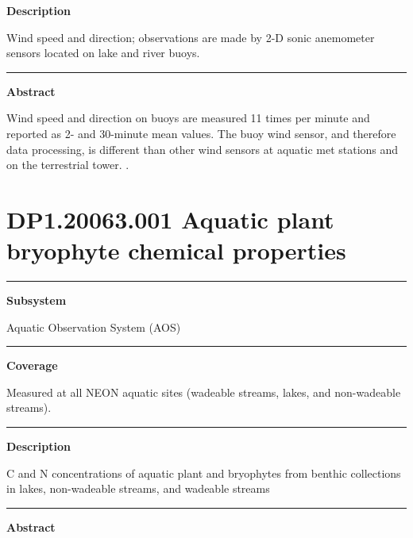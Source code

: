\documentclass[]{article}
\begin{document}
\textbf{Description}

Wind speed and direction; observations are made by 2-D sonic anemometer
sensors located on lake and river buoys.

\begin{center}\rule{0.5\linewidth}{\linethickness}\end{center}

\textbf{Abstract}

Wind speed and direction on buoys are measured 11 times per minute and
reported as 2- and 30-minute mean values. The buoy wind sensor, and
therefore data processing, is different than other wind sensors at
aquatic met stations and on the terrestrial tower. \newpage
.

\section{DP1.20063.001 Aquatic plant bryophyte chemical
properties}\label{dp1.20063.001-aquatic-plant-bryophyte-chemical-properties}

\begin{center}\rule{0.5\linewidth}{\linethickness}\end{center}

\textbf{Subsystem}

Aquatic Observation System (AOS)

\begin{center}\rule{0.5\linewidth}{\linethickness}\end{center}

\textbf{Coverage}

Measured at all NEON aquatic sites (wadeable streams, lakes, and
non-wadeable streams).

\begin{center}\rule{0.5\linewidth}{\linethickness}\end{center}

\textbf{Description}

C and N concentrations of aquatic plant and bryophytes from benthic
collections in lakes, non-wadeable streams, and wadeable streams

\begin{center}\rule{0.5\linewidth}{\linethickness}\end{center}

\textbf{Abstract}
\end{document}
